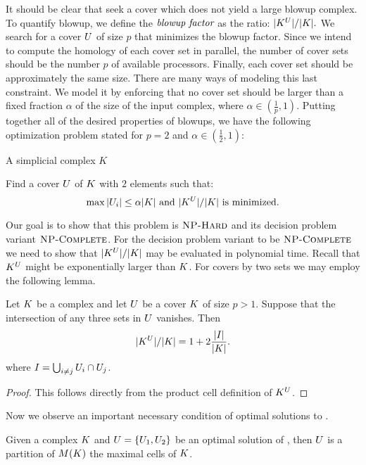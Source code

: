\documentclass{elsarticle}
\begin{document}
It should be clear that seek a cover which does not yield a large blowup complex. 
To quantify blowup, we define the $\emph{blowup factor}$ as the ratio: 
$|K^{U}|/|K|.$ We search for a cover $U$ of size $p$ that minimizes the blowup 
factor. Since we intend to compute the homology of each cover set in parallel,
the number of cover sets should be the number $p$ of available 
processors. Finally, each cover set should be approximately the same 
size. There are many ways of modeling this last constraint. 
We model it by enforcing that no cover set should be larger than a fixed fraction
$\alpha$ of the size of the input complex, where $\alpha \in (\frac{1}{p},1)$. 
Putting together all of the desired properties of blowups, we have the following 
optimization problem stated for $p = 2$ and $\alpha \in (\frac{1}{2}, 1)$:
\begin{description}
\addtolength{\itemsep}{-.7\baselineskip}
\item[\textsc{Problem:}]  \ablp 
\item[\textsc{Instance:}] A simplicial complex $K$
\item[\textsc{Goal:}] Find a cover $U$ of $K$ with $2$ elements such that: 
\[ \max{|U_i|} \leq \alpha|K| \textrm{ and } |K^{U}|/|K| \textrm{ is minimized.} \]
\end{description}
Our goal is to show that this problem is $\textsc{NP-Hard}{}$ and its decision problem variant $\textsc{NP-Complete}{}$.
For the decision problem variant to be $\textsc{NP-Complete}{}$ we need to show that $|K^{U}|/|K|$ may
be evaluated in polynomial time. Recall that $K^{U}$ might be exponentially larger than $K$. 
For covers by two sets we may employ the following lemma.
\begin{lemma}
\label{lem:char-blowup-sol}
Let $K$ be a complex and let $U$ be a cover $K$ 
of size $p > 1$. Suppose that the intersection
of any three sets in $U$ vanishes. Then
\begin{equation*}
|K^{U}|/|K| = 1 + 2\frac{|I|}{|K|}. 
\end{equation*}
where $I = \bigcup_{i \neq j}{U_i \cap U_j}$.
\end{lemma}
\begin{proof}
This follows directly from the product cell definition of $K^U$.
\end{proof}
\noindent Now we observe an important necessary condition of optimal solutions to \ablp{}.
\begin{lemma}
\label{lem:blowup-sol-max-simplices}
Given a complex $K$ and $U = \{U_1, U_2\}$ be an optimal solution of  \ablp{}, then 
$U$ is a partition of $M(K)$ the maximal cells of $K$.
\end{lemma}
\end{document}
